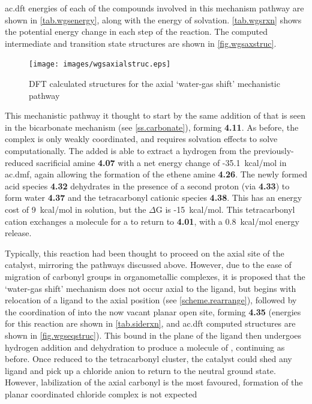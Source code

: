 \Gls{ac.dft} energies of each of the compounds involved in this mechanism pathway are shown in \autoref{tab.wgsenergy}, along with the energy of solvation. \autoref{tab.wgsrxn} shows the potential energy change in each step of the reaction. The computed intermediate and transition state structures are shown in \autoref{fig.wgsaxstruc}.




\begin{figure}[!htb]
 \begin{center}
  \texttt{[image: images/wgsaxialstruc.eps]}
 \end{center}
\caption{DFT calculated structures for the axial `water-gas shift' mechanistic pathway}
\label{fig.wgsaxstruc}
\end{figure}

This mechanistic pathway it thought to start by the same addition of  that is seen in the bicarbonate mechanism (see \autoref{ss.carbonate}), forming \textbf{4.11}. As before, the complex is only weakly coordinated, and requires solvation effects to solve computationally. The added  is able to extract a hydrogen from the previously-reduced sacrificial amine \textbf{4.07} with a net energy change of -35.1~kcal/mol in \gls{ac.dmf}, again allowing the formation of the ethene amine \textbf{4.26}. The newly formed acid species \textbf{4.32} dehydrates in the presence of a second proton (via \textbf{4.33}) to form water \textbf{4.37} and the tetracarbonyl cationic species \textbf{4.38}. This has an energy cost of 9~kcal/mol in solution, but the $\Delta$G is -15~kcal/mol. This tetracarbonyl cation exchanges a  molecule for a  to return to \textbf{4.01}, with a 0.8~kcal/mol energy release. 

Typically, this reaction had been thought to proceed on the axial site of the catalyst, mirroring the pathways discussed above. However, due to the ease of migration of carbonyl groups in organometallic complexes, it is proposed that the `water-gas shift' mechanism does not occur axial to the ligand, but begins with relocation of a  ligand to the axial position (see \autoref{scheme.rearrange}), followed by the coordination of  into the now vacant planar open site, forming \textbf{4.35} (energies for this reaction are shown in \autoref{tab.siderxn}, and \gls{ac.dft} computed structures are shown in \autoref{fig.wgseqstruc}). This  bound in the plane of the ligand then undergoes hydrogen addition and dehydration to produce a molecule of , continuing as before. Once reduced to the tetracarbonyl cluster, the catalyst could shed any  ligand and pick up a chloride anion to return to the neutral ground state. However, labilization of the axial carbonyl is the most favoured, formation of the planar coordinated chloride complex is not expected\autocite{shaver1992}

